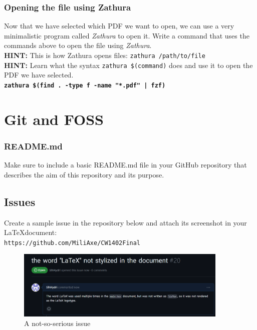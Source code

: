 \documentclass[titlepage, 12pt]{article}
\newcommand{\code}{\texttt}
\begin{document}
	\subsubsection{Opening the file using Zathura}
	Now that we have selected which PDF we want to open, we can use a very minimalistic program called \textit{Zathura} to open it. Write a command that uses the commands above to open the file using \textit{Zathura}.
	\\
	\textbf{HINT:} This is how Zathura opens files: \code{zathura /path/to/file}
	\\
	\textbf{HINT:} Learn what the syntax \code{zathura \$(command)} does and use it to open the PDF we have selected.
	\\
	\textbf{\code{zathura \$(find . -type f -name "*.pdf" | fzf)}}
	
	\section{Git and FOSS}
	
	\subsubsection{README.md}
	Make sure to include a basic README.md file in your GitHub repository that describes the aim of this repository and its purpose.
	
	\subsection{Issues}
	Create a sample issue in the repository below and attach its screenshot in your \LaTeX document:
	\\
	\code{https://github.com/MiliAxe/CW1402Final}
	\\
	\begin{figure}[h]
		\centering
		\includegraphics[width=0.9\textwidth]{image.png}
		\caption{A not-so-serious issue}
	\end{figure}
\end{document}
